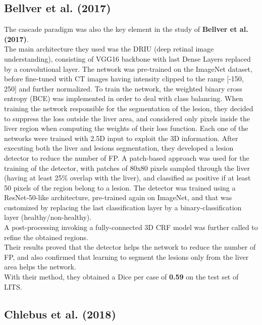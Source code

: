 \subsection*{Bellver et al. (2017)}\label{bellver-et-al.-2017}

The cascade paradigm was also the key element in the study of
\textbf{Bellver et al. (2017)}.\\
The main architecture they used was the DRIU (deep retinal image
understanding), consisting of VGG16 backbone with last Dense Layers
replaced by a convolutional layer. The network was pre-trained on the ImageNet dataset, before fine-tuned
with CT images having intensity clipped to the range {[}-150, 250{]} and
further normalized.
To train the network, the weighted binary cross entropy (BCE) was
implemented in order to deal with class balancing. When training the
network responsible for the segmentation of the lesion, they decided to
suppress the loss outside the liver area, and considered only pixels
inside the liver region when computing the weights of their loss
function. Each one of the networks were trained with 2.5D input to
exploit the 3D information.
After executing both the liver and lesions segmentation, they developed
a lesion detector to reduce the number of FP. A patch-based approach was
used for the training of the detector, with patches of 80x80 pixels
sampled through the liver (having at least 25\% overlap with the liver),
and classified as positive if at least 50 pixels of the region belong to
a lesion.
The detector was trained using a ResNet-50-like architecture,
pre-trained again on ImageNet, and that was customized by replacing the
last classification layer by a binary-classification layer
(healthy/non-healthy).\\
A post-processing invoking a fully-connected 3D CRF model was further
called to refine the obtained regions.\\
Their results proved that the detector helps the network to reduce the
number of FP, and also confirmed that learning to segment the lesions
only from the liver area helps the network.\\
With their method, they obtained a Dice per case of \textbf{0.59} on the
test set of LITS.

\subsection*{Chlebus et al. (2018)}\label{chlebus-et-al.-2018}

